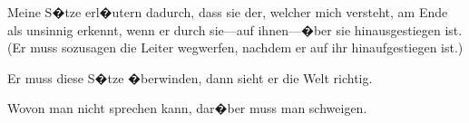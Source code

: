{Meine S�tze erl�utern dadurch, dass sie der,
welcher mich versteht, am Ende als unsinnig
erkennt, wenn er durch sie---auf ihnen---�ber sie
hinausgestiegen ist. (Er muss sozusagen die Leiter
wegwerfen, nachdem er auf ihr hinaufgestiegen ist.)

Er muss diese S�tze �berwinden, dann sieht er
die Welt richtig.}


{Wovon man nicht sprechen kann, dar�ber muss
man schweigen.}
